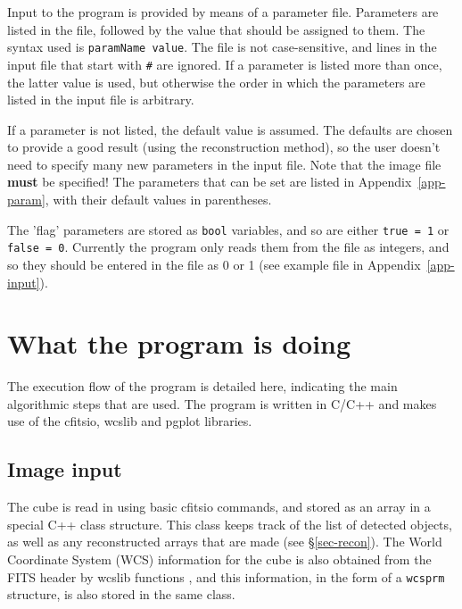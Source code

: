 \documentclass[12pt,a4paper]{article}
\begin{document}
Input to the program is provided by means of a parameter file. Parameters
are listed in the file, followed by the value that should be assigned
to them. The syntax used is {\tt paramName value}. The file is not
case-sensitive, and lines in the input file that start with {\tt \#} are
ignored. If a parameter is listed more than once, the latter value is
used, but otherwise the order in which the parameters are listed in the
input file is arbitrary. 

If a parameter is not listed, the default value is assumed. The
defaults are chosen to provide a good result (using the reconstruction
method), so the user doesn't need to specify many new parameters in
the input file. Note that the image file {\bf must} be specified! The
parameters that can be set are listed in Appendix~\ref{app-param},
with their default values in parentheses.

The 'flag' parameters are stored as {\tt bool} variables, and so are
either {\tt true = 1} or {\tt false = 0}. Currently the program only
reads them from the file as integers, and so they should be entered in
the file as 0 or 1 (see example file in Appendix~\ref{app-input}).

\section{What the program is doing}
\label{sec-flow}

The execution flow of the program is detailed here, indicating the
main algorithmic steps that are used. The program is written in C/C++
and makes use of the {\sc cfitsio}, {\sc wcslib} and {\sc pgplot}
libraries. 

%

\subsection{Image input}

The cube is read in using basic {\sc cfitsio} commands, and stored as
an array in a special C++ class structure. This class keeps track of
the list of detected objects, as well as any reconstructed arrays that
are made (see \S\ref{sec-recon}). The World Coordinate System (WCS)
information for the cube is also obtained from the FITS header by {\sc
wcslib} functions \citep{greisen02, calabretta02}, and this
information, in the form of a {\tt wcsprm} structure, is also stored
in the same class.
\end{document}
